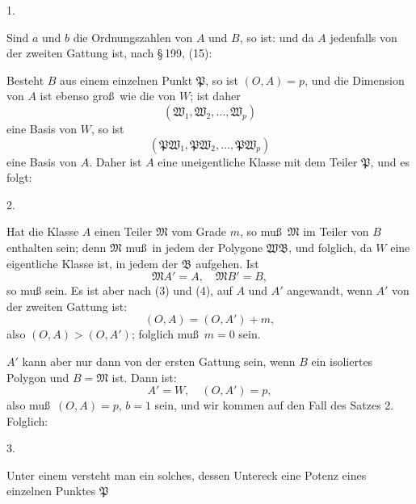 1. 

Sind $a$ und $b$ die Ordnungszahlen von $A$ und $B$, so ist:
und da $A$ jedenfalls von der zweiten Gattung ist, nach \S\,199, (15):

Besteht $B$ aus einem einzelnen Punkt $\mathfrak{P}$, so ist $(O, A) = p$,
und die Dimension von $A$ ist ebenso gro\ss\ wie die von $W$; ist daher
\[
(\mathfrak{W}_1, \mathfrak{W}_2, \ldots, \mathfrak{W}_p)
\]
eine Basis von $W$, so ist
\[
(\mathfrak{P} \mathfrak{W}_1, \mathfrak{P} \mathfrak{W}_2, \ldots, \mathfrak{P} \mathfrak{W}_p)
\]
eine Basis von $A$. Daher ist $A$ eine uneigentliche Klasse mit
dem Teiler $\mathfrak{P}$, und es folgt:

2. 

Hat die Klasse $A$ einen Teiler $\mathfrak{M}$ vom Grade $m$, so mu\ss\ $\mathfrak{M}$
im Teiler von $B$ enthalten sein; denn $\mathfrak{M}$ mu\ss\ in jedem der
Polygone $\mathfrak{W}\mathfrak{B}$, und folglich, da $W$ eine eigentliche Klasse ist, in
jedem der $\mathfrak{B}$ aufgehen. Ist
\[
\mathfrak{M} A' = A, \quad \mathfrak{M} B' = B,
\]
so mu\ss
{}
sein. Es ist aber nach (3) und (4), auf $A$ und $A'$ angewandt,
wenn $A'$ von der zweiten Gattung ist:
\[
(O, A) = (O, A') + m,
\]
also $(O, A) > (O, A')$; folglich mu\ss\ $m = 0$ sein.

$A'$ kann aber nur dann von der ersten Gattung sein, wenn
$B$ ein isoliertes Polygon und $B = \mathfrak{M}$ ist. Dann ist:
\[
A' = W, \quad (O, A') = p,
\]
also mu\ss\ $(O, A) = p$, $b = 1$ sein, und wir kommen auf den
Fall des Satzes 2. Folglich:

3. 

Unter einem  versteht man
ein solches, dessen Untereck eine Potenz eines einzelnen Punktes $\mathfrak{P}$
